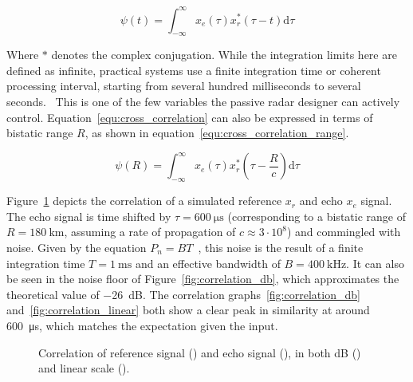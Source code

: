\begin{equation}\label{equ:cross_correlation}
    \psi(t) = \int_{-\infty}^{\infty}{ x_{e}(\tau) x_{r}^{*}(\tau - t) \mathrm{d} \tau }
\end{equation}

Where \(*\) denotes the complex conjugation. While the integration limits here are defined as infinite, practical systems use a finite integration time or coherent processing interval, starting from several hundred milliseconds to several seconds.~\cite[p.~134]{Malanowski2019} This is one of the few variables the passive radar designer can actively control. Equation~\ref{equ:cross_correlation} can also be expressed in terms of bistatic range \(R\), as shown in equation~\ref{equ:cross_correlation_range}.

\begin{equation}\label{equ:cross_correlation_range}
    \psi(R) = \int_{-\infty}^{\infty}{ x_{e}(\tau) x_{r}^{*} \left( \tau - \frac{R}{c} \right) \mathrm{d} \tau }
\end{equation}

Figure~\ref{fig:signal_correlation} depicts the correlation of a simulated reference \(x_r\) and echo \(x_e\) signal. The echo signal is time shifted by \(\tau = \SI{600}{\micro\second}\) (corresponding to a bistatic range of \(R = \SI{180}{\kilo\metre}\), assuming a rate of propagation of \(c \approx 3 \cdot 10^{8}\)) and commingled with noise. Given by the equation \(P_n = BT\)~\cite[pp.~40--44]{Malanowski2019}, this noise is the result of a finite integration time \(T = \SI{1}{\milli\second}\) and an effective bandwidth of \(B = \SI{400}{\kilo\hertz}\). It can also be seen in the noise floor of Figure~\ref{fig:correlation_db}, which approximates the theoretical value of \SI{-26}{\deci\bel}. The correlation graphs~\ref{fig:correlation_db} and~\ref{fig:correlation_linear} both show a clear peak in similarity at around \SI{600}{\micro\second}, which matches the expectation given the input.

\begin{figure}[h]
    \centering
    \linebreak
    \caption{Correlation of reference signal () and echo signal (), in both \si{\deci\bel} () and linear scale ().}\label{fig:signal_correlation}
\end{figure}

